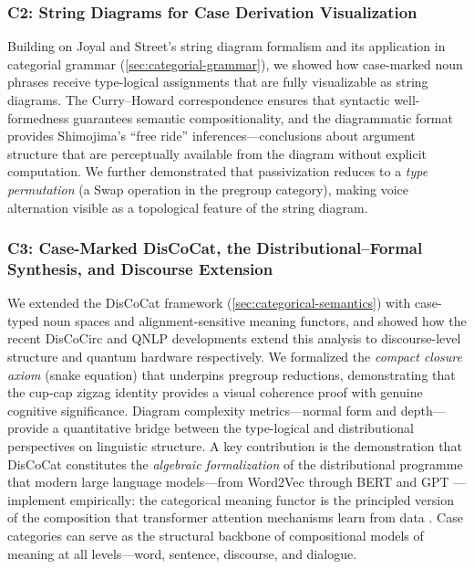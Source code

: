 \documentclass[
]{article}
\begin{document}
\subsubsection{C2: String Diagrams for Case Derivation
Visualization}\label{c2-string-diagrams-for-case-derivation-visualization}

Building on Joyal and Street's \citeyearpar{joyalstreet1991geometry}
string diagram formalism and its application in categorial grammar
(\autoref{sec:categorial-grammar}), we showed how case-marked noun
phrases receive type-logical assignments that are fully visualizable as
string diagrams. The Curry--Howard correspondence ensures that syntactic
well-formedness guarantees semantic compositionality, and the
diagrammatic format provides Shimojima's
\citeyearpar{shimojima1996reasoning} ``free ride''
inferences---conclusions about argument structure that are perceptually
available from the diagram without explicit computation. We further
demonstrated that passivization reduces to a \emph{type permutation} (a
Swap operation in the pregroup category), making voice alternation
visible as a topological feature of the string diagram.

\subsubsection{C3: Case-Marked DisCoCat, the Distributional--Formal
Synthesis, and Discourse
Extension}\label{c3-case-marked-discocat-the-distributionalformal-synthesis-and-discourse-extension}

We extended the DisCoCat framework (\autoref{sec:categorical-semantics})
with case-typed noun spaces and alignment-sensitive meaning functors,
and showed how the recent DisCoCirc \citep{defelice2022discocirc} and
QNLP \citep{lorenz2021lambeq} developments extend this analysis to
discourse-level structure and quantum hardware respectively. We
formalized the \emph{compact closure axiom} (snake equation) that
underpins pregroup reductions, demonstrating that the cup-cap zigzag
identity provides a visual coherence proof with genuine cognitive
significance. Diagram complexity metrics---normal form and
depth---provide a quantitative bridge between the type-logical and
distributional perspectives on linguistic structure. A key contribution
is the demonstration that DisCoCat constitutes the \emph{algebraic
formalization} of the distributional programme that modern large
language models---from Word2Vec \citep{mikolov2013efficient} through
BERT \citep{devlin2019bert} and GPT
\citep{radford2018improving}---implement empirically: the categorical
meaning functor is the principled version of the composition that
transformer attention mechanisms learn from data
\citep{vaswani2017attention}. Case categories can serve as the
structural backbone of compositional models of meaning at all
levels---word, sentence, discourse, and dialogue.
\end{document}

